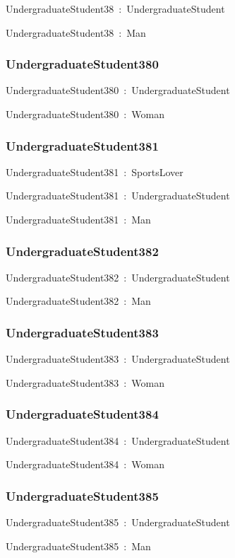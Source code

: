 \documentclass{article}
\begin{document}
UndergraduateStudent38~:~UndergraduateStudent

UndergraduateStudent38~:~Man

\subsubsection*{UndergraduateStudent380}

UndergraduateStudent380~:~UndergraduateStudent

UndergraduateStudent380~:~Woman

\subsubsection*{UndergraduateStudent381}

UndergraduateStudent381~:~SportsLover

UndergraduateStudent381~:~UndergraduateStudent

UndergraduateStudent381~:~Man

\subsubsection*{UndergraduateStudent382}

UndergraduateStudent382~:~UndergraduateStudent

UndergraduateStudent382~:~Man

\subsubsection*{UndergraduateStudent383}

UndergraduateStudent383~:~UndergraduateStudent

UndergraduateStudent383~:~Woman

\subsubsection*{UndergraduateStudent384}

UndergraduateStudent384~:~UndergraduateStudent

UndergraduateStudent384~:~Woman

\subsubsection*{UndergraduateStudent385}

UndergraduateStudent385~:~UndergraduateStudent

UndergraduateStudent385~:~Man
\end{document}
